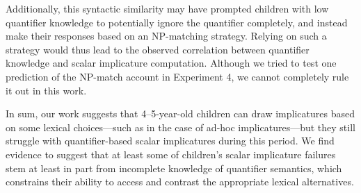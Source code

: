 \documentclass[man]{apa2}
\begin{document}
Additionally, this syntactic similarity may have prompted children with low quantifier knowledge to potentially ignore the quantifier completely, and instead make their responses based on an NP-matching strategy. Relying on such a strategy would thus lead to the observed correlation between quantifier knowledge and scalar implicature computation. Although we tried to test one prediction of the NP-match account in Experiment 4, we cannot completely rule it out in this work.


%
%

In sum, our work suggests that 4--5-year-old children can draw implicatures based on some lexical choices---such as in the case of ad-hoc implicatures---but they still struggle with quantifier-based scalar implicatures during this period. We find evidence to suggest that at least some of children's scalar implicature failures stem at least in part from incomplete knowledge of quantifier semantics, which constrains their ability to access and contrast the appropriate lexical alternatives.
\end{document}
